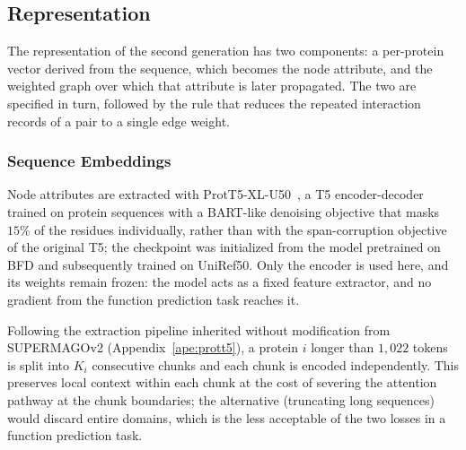 \documentclass[Ingles]{ic-tese-v3}
\begin{document}
\subsection{Representation}
\label{sec:met_repr_g2}

The representation of the second generation has two components: a per-protein vector derived from
the sequence, which becomes the node attribute, and the weighted graph over which that attribute is
later propagated. The two are specified in turn, followed by the rule that reduces the repeated
interaction records of a pair to a single edge weight.

\subsubsection{Sequence Embeddings}
\label{sec:met_prott5}

Node attributes are extracted with ProtT5-XL-U50~\cite{elnaggar2021prottrans}, a T5
encoder-decoder trained on protein sequences with a BART-like denoising objective that masks
$15\%$ of the residues individually, rather than with the span-corruption objective of the
original T5; the checkpoint was initialized from the model pretrained on BFD and subsequently
trained on UniRef50. Only the encoder is used here, and its weights remain frozen: the model acts
as a fixed feature extractor, and no gradient from the function prediction task reaches it.
 
Following the extraction pipeline inherited without modification from SUPERMAGOv2
(Appendix~\ref{ape:prott5}), a protein $i$ longer than $1{,}022$ tokens is split into
$K_i$ consecutive chunks and each chunk is encoded independently. This preserves local context
within
each chunk at the cost of severing the attention pathway at the chunk boundaries; the alternative
(truncating long sequences) would discard entire domains, which is the less acceptable of the two
losses in a function prediction task.
\end{document}
